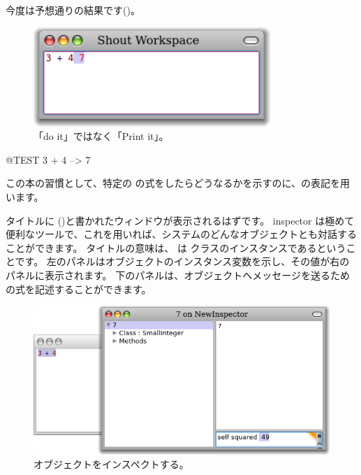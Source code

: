 \documentclass[a4paper,10pt,twoside]{book}
\begin{document}
今度は予想通りの結果です()。

\begin{figure}[htb]
\centerline {\includegraphics[width=0.8\textwidth]{PrintIt}}
\caption{「do it」ではなく「Print it」。}
\end{figure}

\begin{code}{@TEST}
3 + 4 --> 7
\end{code}
\noindent
この本の習慣として、特定の \pharo の式をしたらどうなるかを示すのに、\ct{-->}の表記を用います。

\noindent
タイトルに ()と書かれたウィンドウが表示されるはずです。
inspector は極めて便利なツールで、これを用いれば、システムのどんなオブジェクトとも対話することができます。
タイトルの意味は、 は  クラスのインスタンスであるということです。
左のパネルはオブジェクトのインスタンス変数を示し、その値が右のパネルに表示されます。
下のパネルは、オブジェクトへメッセージを送るための式を記述することができます。

\begin{figure}[htb]
\centerline {\includegraphics[width=\textwidth]{InspectIt}}
\caption{オブジェクトをインスペクトする。}
\end{figure}
\end{document}
